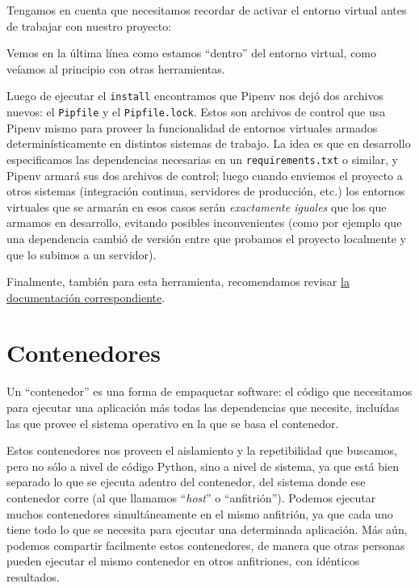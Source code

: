 Tengamos en cuenta que necesitamos recordar de activar el entorno virtual antes de trabajar con nuestro proyecto:


Vemos en la última línea como estamos ``dentro'' del entorno virtual, como veíamos al principio con otras herramientas.

Luego de ejecutar el \texttt{install} encontramos que Pipenv nos dejó dos archivos nuevos: el \texttt{Pipfile} y el \texttt{Pipfile.lock}. Estos son archivos de control que usa Pipenv mismo para proveer la funcionalidad de entornos virtuales armados determinísticamente en distintos sistemas de trabajo. La idea es que en desarrollo especificamos las dependencias necesarias en un \texttt{requirements.txt} o similar, y Pipenv armará sus dos archivos de control; luego cuando enviemos el proyecto a otros sistemas (integración continua, servidores de producción, etc.) los entornos virtuales que se armarán en esos casos serán \textit{exactamente iguales} que los que armamos en desarrollo, evitando posibles inconvenientes (como por ejemplo que una dependencia cambió de versión entre que probamos el proyecto localmente y que lo subimos a un servidor).

Finalmente, también para esta herramienta, recomendamos revisar \href{https://pipenv-es.readthedocs.io/es/latest/}{la documentación correspondiente}.


\section{Contenedores} \label{sec:contenedores}

Un ``contenedor'' es una forma de empaquetar software: el código que necesitamos para ejecutar una aplicación más todas las dependencias que necesite, incluídas las que provee el sistema operativo en la que se basa el contenedor.

Estos contenedores nos proveen el aislamiento y la repetibilidad que buscamos, pero no sólo a nivel de código Python, sino a nivel de sistema, ya que está bien separado lo que se ejecuta adentro del contenedor, del sistema donde ese contenedor corre (al que llamamos ``\textit{host}'' o ``anfitrión''). Podemos ejecutar muchos contenedores simultáneamente en el mismo anfitrión, ya que cada uno tiene todo lo que se necesita para ejecutar una determinada aplicación. Más aún, podemos compartir facilmente estos contenedores, de manera que otras personas pueden ejecutar el mismo contenedor en otros anfitriones, con idénticos resultados.

